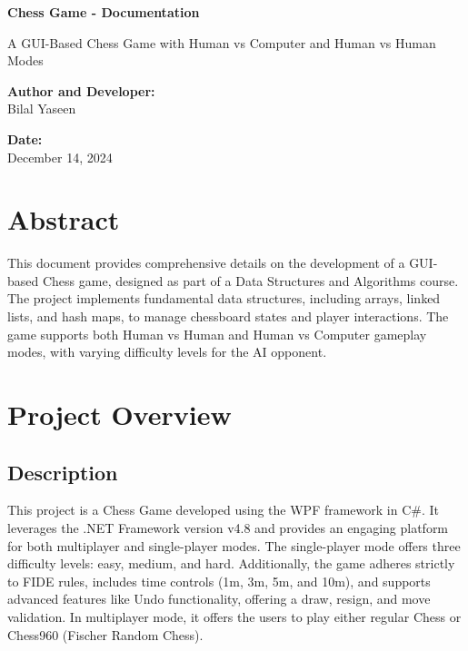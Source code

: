\documentclass[a4paper,12pt]{article}
\begin{document}
\thispagestyle{empty} 

\vspace*{1cm} 

\begin{center}
   \Huge \textbf{Chess Game - Documentation}

    \vspace{0.5cm}
    \Large A GUI-Based Chess Game with Human vs Computer and Human vs Human Modes

    \vspace{1.5cm}
    \textbf{Author and Developer:} \\
    Bilal Yaseen
    
    \vspace{0.5cm}
    \textbf{Date:} \\
    December 14, 2024
\end{center}

\section*{Abstract}
This document provides comprehensive details on the development of a GUI-based Chess game, designed as part of a Data Structures and Algorithms course. The project implements fundamental data structures, including arrays, linked lists, and hash maps, to manage chessboard states and player interactions. The game supports both Human vs Human and Human vs Computer gameplay modes, with varying difficulty levels for the AI opponent.


\newpage

\renewcommand{\contentsname}{Table of Contents}

\tableofcontents

\newpage

\thispagestyle{empty}

\listoffigures

\newpage

\thispagestyle{empty}

\listoftables

\newpage

\pagestyle{fancy}
\fancyhf{}
\fancyfoot[R]{{\thepage}}

\section{Project Overview}

\subsection{Description}
This project is a Chess Game developed using the WPF framework in C\#. It leverages the .NET Framework version v4.8 and provides an engaging platform for both multiplayer and single-player modes. The single-player mode offers three difficulty levels: easy, medium, and hard. Additionally, the game adheres strictly to FIDE rules, includes time controls (1m, 3m, 5m, and 10m), and supports advanced features like Undo functionality, offering a draw, resign, and move validation. In multiplayer mode, it offers the users to play either regular Chess or Chess960 (Fischer Random Chess).
\end{document}
